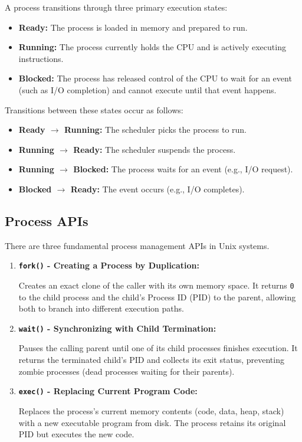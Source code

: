\documentclass[11pt,a4paper]{article}
\begin{document}
A process transitions through three primary execution states:
\begin{itemize}
    \item \textbf{Ready:} The process is loaded in memory and prepared to run.
    \item \textbf{Running:} The process currently holds the CPU and is actively executing instructions.
    \item \textbf{Blocked:} The process has released control of the CPU to wait for an event (such as I/O completion) and cannot execute until that event happens.
\end{itemize}

\noindent Transitions between these states occur as follows:
\begin{itemize}
    \item \textbf{Ready $\rightarrow$ Running:} The scheduler picks the process to run.
    \item \textbf{Running $\rightarrow$ Ready:} The scheduler suspends the process.
    \item \textbf{Running $\rightarrow$ Blocked:} The process waits for an event (e.g., I/O request).
    \item \textbf{Blocked $\rightarrow$ Ready:} The event occurs (e.g., I/O completes).
\end{itemize}

\subsection{Process APIs}

There are three fundamental process management APIs in Unix systems.

\begin{enumerate}
    \item \textbf{\texttt{fork()} - Creating a Process by Duplication:} 
    
    Creates an exact clone of the caller with its own memory space. It returns \texttt{0} to the child process and the child's Process ID (PID) to the parent, allowing both to branch into different execution paths.
    
    \item \textbf{\texttt{wait()} - Synchronizing with Child Termination:} 
    
    Pauses the calling parent until one of its child processes finishes execution. It returns the terminated child's PID and collects its exit status, preventing zombie processes (dead processes waiting for their parents).
    
    \item \textbf{\texttt{exec()} - Replacing Current Program Code:} 
    
    Replaces the process's current memory contents (code, data, heap, stack) with a new executable program from disk. The process retains its original PID but executes the new code.
\end{enumerate}
\end{document}
